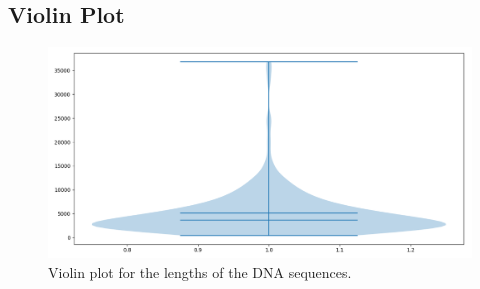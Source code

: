 \documentclass{article}
\begin{document}
			\vspace{83pt}
			\subsection{Violin Plot}
				\begin{figure}[!htbp]
					\centering
					\includegraphics[scale=0.48]{charts/Figure_15}
					\caption{Violin plot for the lengths of the DNA sequences.}
				\end{figure}
				
\end{document}
